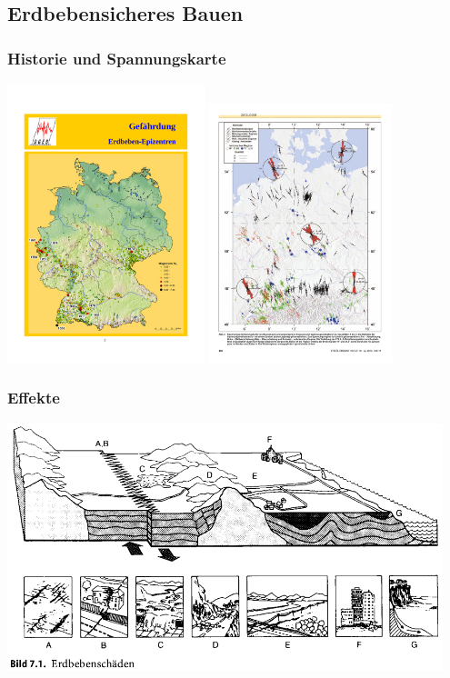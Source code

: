 \subsection{Erdbebensicheres Bauen}

\begin{frame}
\frametitle{Historie und Spannungskarte}
\includegraphics[width=0.43\textwidth]{fig_img/erdbeben_de} %
\hfill
\includegraphics[width=0.4\textwidth]{fig_pdf/spannungslandkarte} %
\end{frame}


\begin{frame}
\frametitle{Effekte}
\includegraphics[width=0.95\textwidth]{fig_img/erdbebenschaeden} %
\end{frame}


